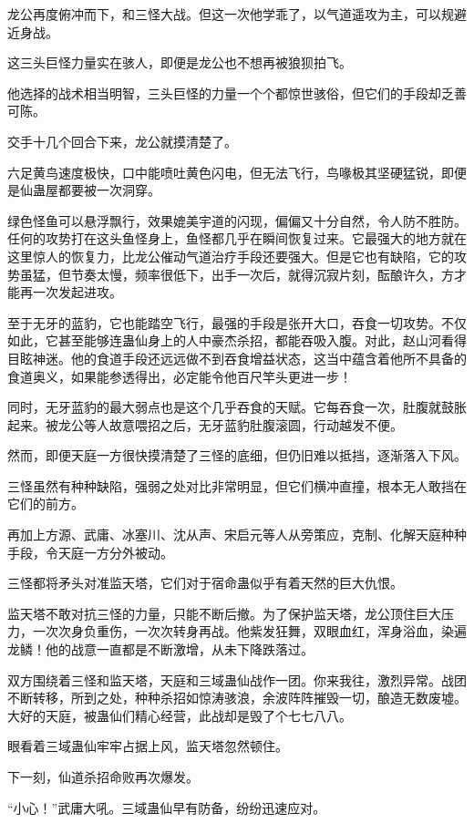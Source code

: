 \begin{this_body}
龙公再度俯冲而下，和三怪大战。但这一次他学乖了，以气道遥攻为主，可以规避近身战。

这三头巨怪力量实在骇人，即便是龙公也不想再被狼狈拍飞。

他选择的战术相当明智，三头巨怪的力量一个个都惊世骇俗，但它们的手段却乏善可陈。

交手十几个回合下来，龙公就摸清楚了。

六足黄鸟速度极快，口中能喷吐黄色闪电，但无法飞行，鸟喙极其坚硬猛锐，即便是仙蛊屋都要被一次洞穿。

绿色怪鱼可以悬浮飘行，效果媲美宇道的闪现，偏偏又十分自然，令人防不胜防。任何的攻势打在这头鱼怪身上，鱼怪都几乎在瞬间恢复过来。它最强大的地方就在这里惊人的恢复力，比龙公催动气道治疗手段还要强大。但是它也有缺陷，它的攻势虽猛，但节奏太慢，频率很低下，出手一次后，就得沉寂片刻，酝酿许久，方才能再一次发起进攻。

至于无牙的蓝豹，它也能踏空飞行，最强的手段是张开大口，吞食一切攻势。不仅如此，它甚至能够连蛊仙身上的人中豪杰杀招，都能吞吸入腹。对此，赵山河看得目眩神迷。他的食道手段还远远做不到吞食增益状态，这当中蕴含着他所不具备的食道奥义，如果能参透得出，必定能令他百尺竿头更进一步！

同时，无牙蓝豹的最大弱点也是这个几乎吞食的天赋。它每吞食一次，肚腹就鼓胀起来。被龙公等人故意喂招之后，无牙蓝豹肚腹滚圆，行动越发不便。

然而，即便天庭一方很快摸清楚了三怪的底细，但仍旧难以抵挡，逐渐落入下风。

三怪虽然有种种缺陷，强弱之处对比非常明显，但它们横冲直撞，根本无人敢挡在它们的前方。

再加上方源、武庸、冰塞川、沈从声、宋启元等人从旁策应，克制、化解天庭种种手段，令天庭一方分外被动。

三怪都将矛头对准监天塔，它们对于宿命蛊似乎有着天然的巨大仇恨。

监天塔不敢对抗三怪的力量，只能不断后撤。为了保护监天塔，龙公顶住巨大压力，一次次身负重伤，一次次转身再战。他紫发狂舞，双眼血红，浑身浴血，染遍龙鳞！他的战意一直都是不断激增，从未下降跌落过。

双方围绕着三怪和监天塔，天庭和三域蛊仙战作一团。你来我往，激烈异常。战团不断转移，所到之处，种种杀招如惊涛骇浪，余波阵阵摧毁一切，酿造无数废墟。大好的天庭，被蛊仙们精心经营，此战却是毁了个七七八八。

眼看着三域蛊仙牢牢占据上风，监天塔忽然顿住。

下一刻，仙道杀招命败再次爆发。

“小心！”武庸大吼。三域蛊仙早有防备，纷纷迅速应对。


\end{this_body}
